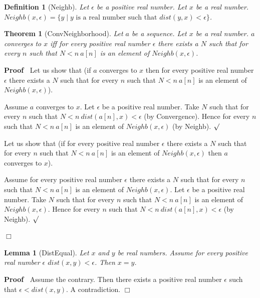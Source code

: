 \documentclass{article}
\newenvironment{forthel}{\begin{leftbar}}{\end{leftbar}}
\newenvironment{proof}{\noindent\textbf{Proof\ }}{\hspace*{\fill}$\Box$\medskip}
\newenvironment{subproof}{\begin{list}{}{}
		\item[\text{Proof}]}{\hfill $\surd$ \end{list}}
\newtheorem{lemma}{Lemma}
\newtheorem{theorem}{Theorem}
\newtheorem{definition}{Definition}
\begin{document}
\begin{forthel}
	\begin{definition}[Neighb]
		Let $\epsilon$ be a positive real number. Let $x$ be a real number.
		$Neighb(x,\epsilon) = \{y \mid y \text{ is a real number such that } dist(y,x) < \epsilon\}$.
	\end{definition}
	
	\begin{theorem}[ConvNeighborhood]
		Let $a$ be a sequence. Let $x$ be a real number.
		$a$ converges to $x$ iff for every positive real number $\epsilon$ there exists a $N$
		such that for every $n$ such that $N < n \ a[n]$ is an element of $Neighb(x,\epsilon)$.
	\end{theorem}

	\begin{proof}
		Let us show that (if $a$ converges to $x$ then for every positive real number $\epsilon$ there exists a $N$
		such that for every $n$ such that $N < n \ a[n]$ is an element of $Neighb(x,\epsilon)$).
		\begin{subproof}
			Assume $a$ converges to $x$.
			Let $\epsilon$ be a positive real number.
			Take $N$ such that for every $n$ such that $N < n \ dist(a[n],x) < \epsilon$ (by Convergence).
			Hence for every $n$ such that $N < n \ a[n]$ is an element of $Neighb(x,\epsilon)$ (by Neighb).
		\end{subproof}
	
		\noindent Let us show that (if for every positive real number $\epsilon$ there exists a $N$ such that
		for every $n$ such that $N < n \ a[n]$ is an element of $Neighb(x,\epsilon)$ then $a$ converges to $x$).
		\begin{subproof}
			Assume for every positive real number $\epsilon$ there exists a $N$ such that
			for every $n$ such that $N < n \ a[n]$ is an element of $Neighb(x,\epsilon)$.
			Let $\epsilon$ be a positive real number.
			Take $N$ such that for every $n$ such that $N < n \ a[n]$ is an element of $Neighb(x,\epsilon)$.
			Hence for every $n$ such that $N < n \ dist(a[n],x) < \epsilon$ (by Neighb).
		\end{subproof}
	\end{proof}	
	
	\begin{lemma}[DistEqual]
		Let $x$ and $y$ be real numbers. Assume for every positive real number $\epsilon$ $dist(x,y) < \epsilon$.
		Then $x = y$.
	\end{lemma}

	\begin{proof}
		Assume the contrary.
		Then there exists a positive real number $\epsilon$ such that $\epsilon < dist(x,y)$.
		A contradiction.
	\end{proof}
\end{forthel}
\end{document}
